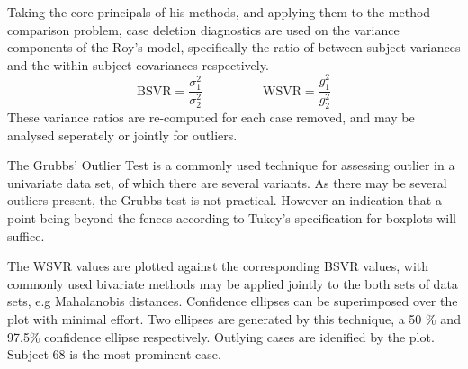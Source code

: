 \documentclass[12pt, a4paper]{report}
\theoremstyle{definition}
\theoremstyle{remark}
\begin{document}
Taking the core principals of his methods, and applying them to the method comparison problem, case deletion diagnostics are used on the variance components of the Roy's model, specifically the ratio of between subject variances and the within subject covariances respectively.
\[ \mbox{BSVR} = \frac{\sigma^2_1}{\sigma^2_2} \phantom{makespace}  \mbox{WSVR} = \frac{g^2_1}{g^2_2} \]
These variance ratios are re-computed for each case removed, and may be analysed seperately or jointly for outliers.

The Grubbs' Outlier Test is a commonly used technique for assessing outlier in a univariate data set, of which there are several variants. As there may be several outliers present, the Grubbs test is not practical. However an indication that a point being beyond the fences according to Tukey's specification for boxplots will suffice.


% 

The WSVR values are plotted against the corresponding BSVR values, with commonly used bivariate methods may be applied jointly to the both sets of data sets, e.g Mahalanobis distances. Confidence ellipses can be superimposed over the plot with minimal effort. Two ellipses are generated by this technique, a 50 \% and 97.5\% confidence ellipse respectively. Outlying cases are idenified by the plot. Subject 68 is the most prominent case.
\end{document}
